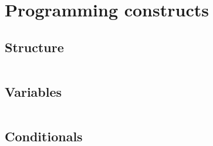 \documentclass[slides]{pgnotes}
\begin{document}
\section{Programming constructs}

\subsection{Structure}

\inputminted{postgresql}{km_to_miles.sql}

\subsection{Variables}

\inputminted{postgresql}{variables.sql}

\subsection{Conditionals}

\inputminted{postgresql}{conditionals.sql}
\end{document}
